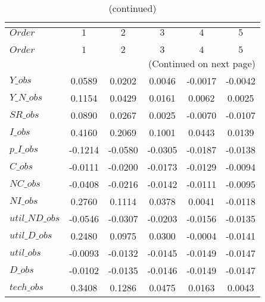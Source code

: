 
\begin{center}
\begin{longtable}{lccccc} 
\caption{COEFFICIENTS OF AUTOCORRELATION}\\
 \label{Table:th_autocorr_matrix}\\
\toprule 
$Order          $	 & 	 $          1$	 & 	 $          2$	 & 	 $          3$	 & 	 $          4$	 & 	 $          5$\\
\midrule \endfirsthead 
\caption{(continued)}\\
 \toprule \\ 
$Order          $	 & 	 $          1$	 & 	 $          2$	 & 	 $          3$	 & 	 $          4$	 & 	 $          5$\\
\midrule \endhead 
\midrule \multicolumn{6}{r}{(Continued on next page)} \\ \bottomrule \endfoot 
\bottomrule \endlastfoot 
$Y\_obs         $	 & 	     0.0589	 & 	     0.0202	 & 	     0.0046	 & 	    -0.0017	 & 	    -0.0042 \\ 
$Y\_N\_obs      $	 & 	     0.1154	 & 	     0.0429	 & 	     0.0161	 & 	     0.0062	 & 	     0.0025 \\ 
$SR\_obs        $	 & 	     0.0890	 & 	     0.0267	 & 	     0.0025	 & 	    -0.0070	 & 	    -0.0107 \\ 
$I\_obs         $	 & 	     0.4160	 & 	     0.2069	 & 	     0.1001	 & 	     0.0443	 & 	     0.0139 \\ 
$p\_I\_obs      $	 & 	    -0.1214	 & 	    -0.0580	 & 	    -0.0305	 & 	    -0.0187	 & 	    -0.0138 \\ 
$C\_obs         $	 & 	    -0.0111	 & 	    -0.0200	 & 	    -0.0173	 & 	    -0.0129	 & 	    -0.0094 \\ 
$NC\_obs        $	 & 	    -0.0408	 & 	    -0.0216	 & 	    -0.0142	 & 	    -0.0111	 & 	    -0.0095 \\ 
$NI\_obs        $	 & 	     0.2760	 & 	     0.1114	 & 	     0.0378	 & 	     0.0041	 & 	    -0.0118 \\ 
$util\_ND\_obs  $	 & 	    -0.0546	 & 	    -0.0307	 & 	    -0.0203	 & 	    -0.0156	 & 	    -0.0135 \\ 
$util\_D\_obs   $	 & 	     0.2480	 & 	     0.0975	 & 	     0.0300	 & 	    -0.0004	 & 	    -0.0141 \\ 
$util\_obs      $	 & 	    -0.0093	 & 	    -0.0132	 & 	    -0.0145	 & 	    -0.0149	 & 	    -0.0147 \\ 
$D\_obs         $	 & 	    -0.0102	 & 	    -0.0135	 & 	    -0.0146	 & 	    -0.0149	 & 	    -0.0147 \\ 
$tech\_obs      $	 & 	     0.3408	 & 	     0.1286	 & 	     0.0475	 & 	     0.0163	 & 	     0.0043 \\ 
\end{longtable}
 \end{center}
